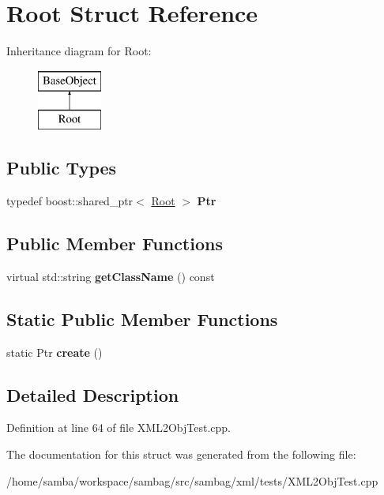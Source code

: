 \hypertarget{struct_root}{
\section{Root Struct Reference}
\label{struct_root}
}
Inheritance diagram for Root:\begin{figure}[H]
\begin{center}
\leavevmode
\includegraphics[height=2.000000cm]{struct_root}
\end{center}
\end{figure}
\subsection*{Public Types}
\begin{DoxyCompactItemize}
\item 
\hypertarget{struct_root_ac88e2fc9ec740e51c91f1b2991972cbd}{
typedef boost::shared\_\-ptr$<$ \hyperlink{struct_root}{Root} $>$ {\bfseries Ptr}}
\label{struct_root_ac88e2fc9ec740e51c91f1b2991972cbd}

\end{DoxyCompactItemize}
\subsection*{Public Member Functions}
\begin{DoxyCompactItemize}
\item 
\hypertarget{struct_root_af6da62aa054c938eaac301d5847fb9b7}{
virtual std::string {\bfseries getClassName} () const }
\label{struct_root_af6da62aa054c938eaac301d5847fb9b7}

\end{DoxyCompactItemize}
\subsection*{Static Public Member Functions}
\begin{DoxyCompactItemize}
\item 
\hypertarget{struct_root_ae770a0682c207a6c949ebd5051f9a044}{
static Ptr {\bfseries create} ()}
\label{struct_root_ae770a0682c207a6c949ebd5051f9a044}

\end{DoxyCompactItemize}


\subsection{Detailed Description}


Definition at line 64 of file XML2ObjTest.cpp.



The documentation for this struct was generated from the following file:\begin{DoxyCompactItemize}
\item 
/home/samba/workspace/sambag/src/sambag/xml/tests/XML2ObjTest.cpp\end{DoxyCompactItemize}
